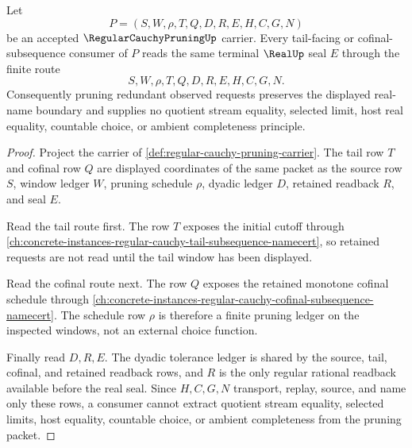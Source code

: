\begin{theorem}
\label{thm:regular-cauchy-pruning-tail-stability}
Let
$$
P=(S,W,\rho,T,Q,D,R,E,H,C,G,N)
$$
be an accepted $\RegularCauchyPruningUp$ carrier. Every tail-facing or cofinal-subsequence consumer of $P$ reads the same terminal $\RealUp$ seal $E$ through the finite route
$$
S,W,\rho,T,Q,D,R,E,H,C,G,N.
$$
Consequently pruning redundant observed requests preserves the displayed real-name boundary and supplies no quotient stream equality, selected limit, host real equality, countable choice, or ambient completeness principle.
\end{theorem}
\begin{proof}
Project the carrier of \autoref{def:regular-cauchy-pruning-carrier}. The tail row $T$ and cofinal row $Q$ are displayed coordinates of the same packet as the source row $S$, window ledger $W$, pruning schedule $\rho$, dyadic ledger $D$, retained readback $R$, and seal $E$.

Read the tail route first. The row $T$ exposes the initial cutoff through \autoref{ch:concrete-instances-regular-cauchy-tail-subsequence-namecert}, so retained requests are not read until the tail window has been displayed.

Read the cofinal route next. The row $Q$ exposes the retained monotone cofinal schedule through \autoref{ch:concrete-instances-regular-cauchy-cofinal-subsequence-namecert}. The schedule row $\rho$ is therefore a finite pruning ledger on the inspected windows, not an external choice function.

Finally read $D,R,E$. The dyadic tolerance ledger is shared by the source, tail, cofinal, and retained readback rows, and $R$ is the only regular rational readback available before the real seal. Since $H,C,G,N$ transport, replay, source, and name only these rows, a consumer cannot extract quotient stream equality, selected limits, host equality, countable choice, or ambient completeness from the pruning packet.
\end{proof}

